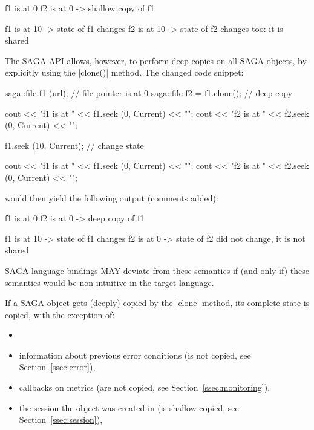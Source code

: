    \begin{myio}
   f1 is at 0 
   f2 is at 0   -> shallow copy of f1

   f1 is at 10  -> state of f1 changes
   f2 is at 10  -> state of f2 changes too: it is shared
   \end{myio}
   
   The SAGA API allows, however, to perform deep copies on all
   SAGA objects, by explicitly using the |clone()| method.  The
   changed code snippet:

   \begin{mycode}
   saga::file f1 (url);        // file pointer is at 0
   saga::file f2 = f1.clone(); // deep copy
 
   cout << "f1 is at " << f1.seek (0, Current) << "\n";
   cout << "f2 is at " << f2.seek (0, Current) << "\n";

   f1.seek (10, Current);      // change state

   cout << "f1 is at " << f1.seek (0, Current) << "\n";
   cout << "f2 is at " << f2.seek (0, Current) << "\n";
   \end{mycode}

   would then yield the following output (comments added):

   \begin{myio}
   f1 is at 0 
   f2 is at 0   -> deep copy of f1

   f1 is at 10  -> state of f1 changes
   f2 is at 0   -> state of f2 did not change, it is not shared
   \end{myio}

   SAGA language bindings MAY deviate from these semantics if
   (and only if) these semantics would be non-intuitive in the
   target language.

   If a SAGA object gets (deeply) copied by the |clone| method,
   its complete state is copied, with the exception of:

   \begin{itemize}
     \item {}
     \item information about previous error conditions
           (is not copied, see Section~\ref{ssec:error}),
     \item callbacks on metrics
           (are not copied, see Section~\ref{ssec:monitoring}).
     \item the session the object was created in
           (is shallow copied, see Section~\ref{ssec:session}),
   \end{itemize}

